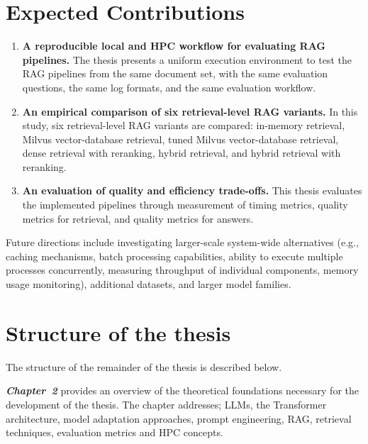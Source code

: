 \section{Expected Contributions}

\begin{enumerate}
    \item {\textbf{A reproducible local and \ac{HPC} workflow for evaluating \ac{RAG} pipelines.}}\newline
    The thesis presents a uniform execution environment to test the \ac{RAG} pipelines from the same document set, with the same evaluation questions, the same log formats, and the same evaluation workflow.
    
    \item {\textbf{An empirical comparison of six retrieval-level \ac{RAG} variants.}}\newline
    In this study, six retrieval-level \ac{RAG} variants are compared: in-memory retrieval, Milvus vector-database retrieval, tuned Milvus vector-database retrieval, dense retrieval with reranking, hybrid retrieval, and hybrid retrieval with reranking.
    
    \item {\textbf{An evaluation of quality and efficiency trade-offs.}}\newline
    This thesis evaluates the implemented pipelines through measurement of timing metrics, quality metrics for retrieval, and quality metrics for answers.
\end{enumerate}

Future directions include investigating larger-scale system-wide alternatives (e.g., caching mechanisms, batch processing capabilities, ability to execute multiple processes concurrently, measuring throughput of individual components, memory usage monitoring), additional datasets, and larger model families.

\section{Structure of the thesis}

The structure of the remainder of the thesis is described below.

\textit{\textbf{Chapter~2}} provides an overview of the theoretical foundations necessary for the development of the thesis. The chapter addresses; \acfp{LLM}, the Transformer architecture, model adaptation approaches, prompt engineering, \acf{RAG}, retrieval techniques, evaluation metrics and \acf{HPC} concepts.

